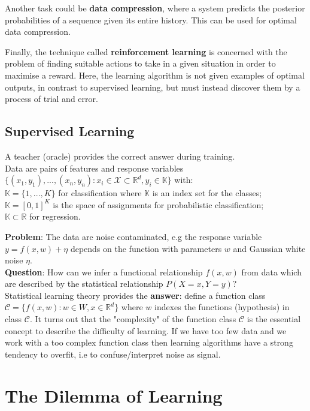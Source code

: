 \documentclass[twoside]{article}
\begin{document}
Another task could be \textbf{data compression}, where a system predicts the posterior probabilities of a sequence given its entire history. This can be used for optimal data compression.\medskip

Finally, the technique called \textbf{reinforcement learning} is concerned with the problem of finding suitable actions to take in a given situation in order to maximise a reward. Here, the learning algorithm is not given examples of optimal outputs, in contrast to supervised learning, but must instead discover them by a process of trial and error.

\subsection{Supervised Learning}

A teacher (oracle) provides the correct answer during training.\\
Data are pairs of features and response variables $\{(x_1, y_1), ..., (x_n, y_n) : x_i \in \mathcal{X} \subset \mathbb{R}^d, y_i \in  \mathbb{K}\}$ with:\\
$\mathbb{K} = \{1,...,K\}$ for classification where $\mathbb{K}$ is an index set for the classes;\\
$\mathbb{K} = [0, 1]^K$ is the space of assignments for probabilistic classification;\\
$\mathbb{K} \subset \mathbb{R}$ for regression.\medskip

\textbf{Problem}: The data are noise contaminated, e.g the response variable $y = f(x,w) + \eta$ depends on the function with parameters $w$ and Gaussian white noise $\eta$.\\
\textbf{Question}: How can we infer a functional relationship $f(x, w)$ from data which are described by the statistical relationship $P(X = x, Y = y)$?\\
Statistical learning theory provides the \textbf{answer}: define a function class $\mathcal{C} = \{f(x, w): w \in W, x \in \mathbb{R}^d\}$ where $w$ indexes the functions (hypothesis) in class $\mathcal{C}$. It turns out that the "complexity" of the function class $\mathcal{C}$ is the essential concept to describe the difficulty of learning. If we have too few data and we work with a too complex function class then learning algorithms have a strong tendency to overfit, i.e to confuse/interpret noise as signal.

\newpage

\section{The Dilemma of Learning}
\end{document}

